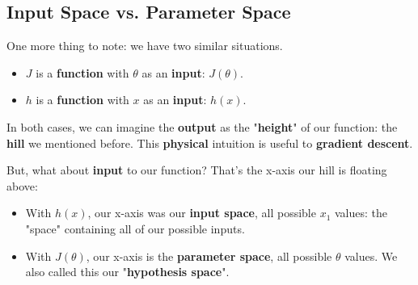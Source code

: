     \subsection{Input Space vs. Parameter Space}
    
        One more thing to note: we have two similar situations.
        
        \begin{itemize}
            \item $J$ is a \textbf{function} with $\theta$ as an \textbf{input}: $J(\theta)$.
            
            \item $h$ is a \textbf{function} with $x$ as an \textbf{input}: $h(x)$. 
        \end{itemize}
        
        In both cases, we can imagine the \textbf{output} as the "\textbf{height}" of our function: the \textbf{hill} we mentioned before. This \textbf{physical} intuition is useful to \textbf{gradient descent}.
        
        But, what about \textbf{input} to our function? That's the x-axis our hill is floating above:
        
        \begin{itemize}
            \item With $h(x)$, our x-axis was our \textbf{input space}, all possible $x_1$ values: the "space" containing all of our possible inputs.
            
            \item With $J(\theta)$, our x-axis is the \textbf{parameter space}, all possible $\theta$ values. We also called this our "\textbf{hypothesis space}".
                \\
        \end{itemize}
        
